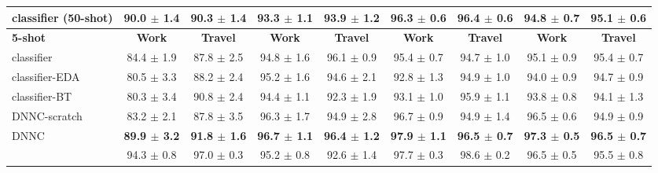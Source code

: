 \begin{table}[h]
{\begin{tabular}{lcccccccc}
\multicolumn{1}{l|}{classifier (50-shot)}       &   90.0 $\pm$ 1.4       & \multicolumn{1}{c|}{90.3 $\pm$ 1.4}          &     93.3 $\pm$ 1.1     & \multicolumn{1}{c|}{93.9 $\pm$ 1.2}          &     96.3 $\pm$ 0.6     & \multicolumn{1}{c|}{96.4 $\pm$ 0.6}          &    94.8  $\pm$ 0.7     &  95.1 $\pm$ 0.6        \\ \hline
\multicolumn{1}{l|}{\textbf{5-shot}}  & \textbf{Work}                        & \multicolumn{1}{c|}{\textbf{Travel}}                      & \textbf{Work}                        & \multicolumn{1}{c|}{\textbf{Travel}}                      & \textbf{Work}                        & \multicolumn{1}{c|}{\textbf{Travel}}                      & \textbf{Work}                        & \textbf{Travel}                      \\ \hline
\multicolumn{1}{l|}{classifier}       & 84.4 $\pm$ 1.9          & \multicolumn{1}{c|}{87.8 $\pm$ 2.5}          & 94.8 $\pm$ 1.6          & \multicolumn{1}{c|}{96.1 $\pm$ 0.9}          & 95.4 $\pm$ 0.7          & \multicolumn{1}{c|}{94.7 $\pm$ 1.0}          & 95.1 $\pm$ 0.9          & 95.4 $\pm$ 0.7          \\
\multicolumn{1}{l|}{classifier-EDA}   & 80.5 $\pm$ 3.3          & \multicolumn{1}{c|}{88.2 $\pm$ 2.4}          & 95.2 $\pm$ 1.6          & \multicolumn{1}{c|}{94.6 $\pm$ 2.1}          & 92.8 $\pm$ 1.3          & \multicolumn{1}{c|}{94.9 $\pm$ 1.0}          & 94.0 $\pm$ 0.9          & 94.7 $\pm$ 0.9          \\
\multicolumn{1}{l|}{classifier-BT}    & 80.3 $\pm$ 3.4          & \multicolumn{1}{c|}{90.8 $\pm$ 2.4}          & 94.4 $\pm$ 1.1          & \multicolumn{1}{c|}{92.3 $\pm$ 1.9}          & 93.1 $\pm$ 1.0          & \multicolumn{1}{c|}{95.9 $\pm$ 1.1}          & 93.8 $\pm$ 0.8          & 94.1 $\pm$ 1.3          \\
\multicolumn{1}{l|}{DNNC-scratch}      & 83.2 $\pm$ 2.1          & \multicolumn{1}{c|}{87.8 $\pm$ 3.5}          & 96.3 $\pm$ 1.7          & \multicolumn{1}{c|}{94.9 $\pm$ 2.8}          & 96.7 $\pm$ 0.9          & \multicolumn{1}{c|}{94.9 $\pm$ 1.4}          & 96.5 $\pm$ 0.6          & 94.9 $\pm$ 0.9          \\
\multicolumn{1}{l|}{DNNC}    & \textbf{89.9 $\pm$ 3.2} & \multicolumn{1}{c|}{\textbf{91.8 $\pm$ 1.6}} & \textbf{96.7 $\pm$ 1.1} & \multicolumn{1}{c|}{\textbf{96.4 $\pm$ 1.2}} & \textbf{97.9 $\pm$ 1.1} & \multicolumn{1}{c|}{\textbf{96.5 $\pm$ 0.7}} & \textbf{97.3 $\pm$ 0.5} & \textbf{96.5 $\pm$ 0.7} \\ \hdashline
\multicolumn{1}{l|}{classifier (50-shot)}       &  94.3 $\pm$ 0.8      & \multicolumn{1}{c|}{97.0 $\pm$ 0.3}          &   95.2 $\pm$ 0.8       & \multicolumn{1}{c|}{92.6 $\pm$ 1.4}          &     97.7 $\pm$ 0.3     & \multicolumn{1}{c|}{98.6 $\pm$ 0.2}          &     96.5 $\pm$ 0.5     &    95.5 $\pm$ 0.8      \\ \hline

\end{tabular}}
\end{table}
